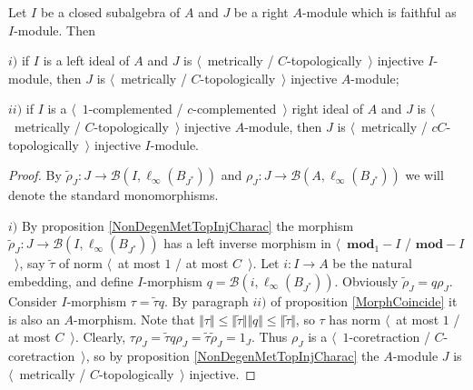 \begin{proposition}\label{MetTopInjUnderChangeOfAlg} Let $I$ be a closed subalgebra of $A$ and $J$ be a right $A$-module which is faithful as $I$-module. Then

$i)$ if $I$ is a left ideal of $A$ and $J$ is $\langle$~metrically / $C$-topologically~$\rangle$  injective $I$-module, then $J$ is $\langle$~metrically / $C$-topologically~$\rangle$ injective $A$-module;

$ii)$ if $I$ is a $\langle$~$1$-complemented / $c$-complemented~$\rangle$ right ideal of $A$ and $J$ is $\langle$~metrically / $C$-topologically~$\rangle$ injective $A$-module, then $J$ is $\langle$~metrically / $cC$-topologically~$\rangle$ injective $I$-module.
\end{proposition}
\begin{proof} By $\widetilde{\rho}_J:J\to\mathcal{B}(I,\ell_\infty(B_{J^*}))$ and $\rho_J:J\to\mathcal{B}(A,\ell_\infty(B_{J^*}))$ we will denote the standard monomorphisms.

$i)$ By proposition \ref{NonDegenMetTopInjCharac} the morphism $\widetilde{\rho}_J: J\to\mathcal{B}(I,\ell_\infty(B_{J^*}))$ has a left inverse morphism in $\langle$~$\mathbf{mod}_1-I$ / $\mathbf{mod}-I$~$\rangle$, say $\widetilde{\tau}$ of norm $\langle$~at most $1$ / at most $C$~$\rangle$. Let $i:I\to A$ be the natural embedding, and define $I$-morphism $q=\mathcal{B}(i,\ell_\infty(B_{J^*}))$. Obviously  $\widetilde{\rho}_J=q\rho_J$. Consider $I$-morphism $\tau =\widetilde{\tau} q$. By paragraph $ii)$ of proposition \ref{MorphCoincide} it is also an $A$-morphism. Note that $\Vert\tau \Vert\leq\Vert\widetilde{\tau}\Vert\Vert q\Vert\leq\Vert\widetilde{\tau}\Vert$, so $\tau$ has norm $\langle$~at most $1$ / at most $C$~$\rangle$. Clearly, $\tau \rho_J=\widetilde{\tau} q\rho_J=\widetilde{\tau}\widetilde{\rho}_J=1_J$. Thus $\rho_J$ is a $\langle$~$1$-coretraction / $C$-coretraction~$\rangle$, so by proposition \ref{NonDegenMetTopInjCharac} the $A$-module $J$ is $\langle$~metrically / $C$-topologically~$\rangle$ injective.


\end{proof}
